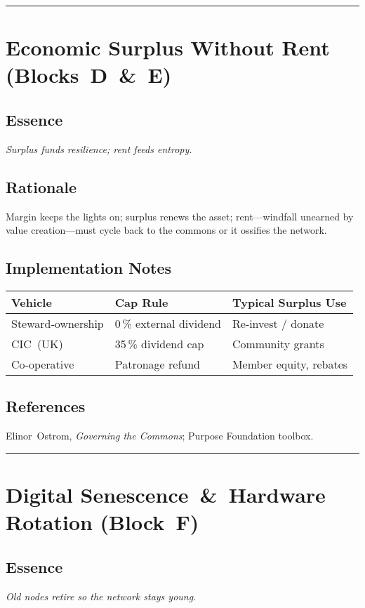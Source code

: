 \bigskip\hrule\bigskip

\section{Economic Surplus Without Rent (Blocks D \& E)}
\subsection*{Essence}
\emph{Surplus funds resilience; rent feeds entropy.}

\subsection*{Rationale}
Margin keeps the lights on; surplus renews the asset; rent—windfall unearned by value creation—must cycle back to the commons or it ossifies the network.

\subsection*{Implementation Notes}
\begin{center}
\begin{tabular}{@{}lll@{}}
\toprule
\textbf{Vehicle} & \textbf{Cap Rule} & \textbf{Typical Surplus Use} \\
\midrule
Steward‑ownership & 0\,\% external dividend & Re‑invest / donate \\
CIC (UK) & 35\,\% dividend cap & Community grants \\
Co‑operative & Patronage refund & Member equity, rebates \\
\bottomrule
\end{tabular}
\end{center}

\subsection*{References}
Elinor Ostrom, \emph{Governing the Commons}; Purpose Foundation toolbox.

\bigskip\hrule\bigskip

\section{Digital Senescence \& Hardware Rotation (Block F)}
\subsection*{Essence}
\emph{Old nodes retire so the network stays young.}

